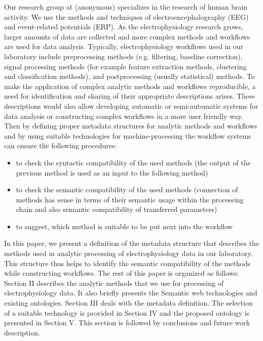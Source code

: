 \documentclass[a4paper,twoside]{article}
\begin{document}
\noindent Our research group at (anonymous) %
specializes in the research of human brain activity. We use the methods and techniques of electroencephalography (EEG) and event-related potentials (ERP). As the electrophysiology research grows, larger amounts of data are collected and more complex methods and workflows are used for data analysis. Typically, electrophysiology workflows used in our laboratory include preprocessing methods (e.g. filtering, baseline correction), signal processing methods (for example feature extraction methods, clustering and classification methods), and postprocessing (usually statistical) methods. To make the application of complex analytic methods and workflows reproducible, a need for identification and sharing of their appropriate descriptions arises. These descriptions would also allow developing automatic or semi-automatic systems for data analysis or constructing complex workflows in a more user friendly way. Then by defining proper metadata structures for analytic methods and workflows and by using suitable technologies for machine-processing the workflow systems can ensure the following procedures:

\begin{itemize}

\item to check the syntactic compatibility of the used methods (the output of the previous method is used as an input to the following method)
\item to check the semantic compatibility of the used methods (connection of methods has sense in terms of their semantic usage within the processing chain and also semantic compatibility of transferred parameters)
\item to suggest, which method is suitable to be put next into the workflow

\end{itemize}

In this paper, we present a definition of the metadata structure that describes the methods used in analytic processing of electrophysiology data in our laboratory. This structure thus helps to identify the semantic compatibility of the methods while constructing workflows. The rest of this paper is organized as follows: Section II describes the analytic methods that we use for processing of electrophysiology data. It also briefly presents the Semantic web technologies and existing ontologies. Section III deals with the metadata definition. The selection of a suitable technology is provided in Section IV and the proposed ontology is presented in Section V. This section is followed by conclusions and future work description.
\end{document}
